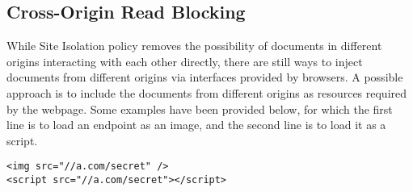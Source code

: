\documentclass[10pt,conference]{IEEEtran}
\begin{document}



\subsection{Cross-Origin Read Blocking}
\label{corb-background}
While Site Isolation policy removes the possibility of documents in different origins interacting with each other directly, there are still ways to inject documents from different origins via interfaces provided by browsers. A possible approach is to include the documents from different origins as resources required by the webpage. Some examples have been provided below, for which the first line is to load an endpoint as an image, and the second line is to load it as a script.

{\footnotesize
\begin{verbatim}
<img src="//a.com/secret" />
<script src="//a.com/secret"></script>
\end{verbatim}
}



\end{document}
